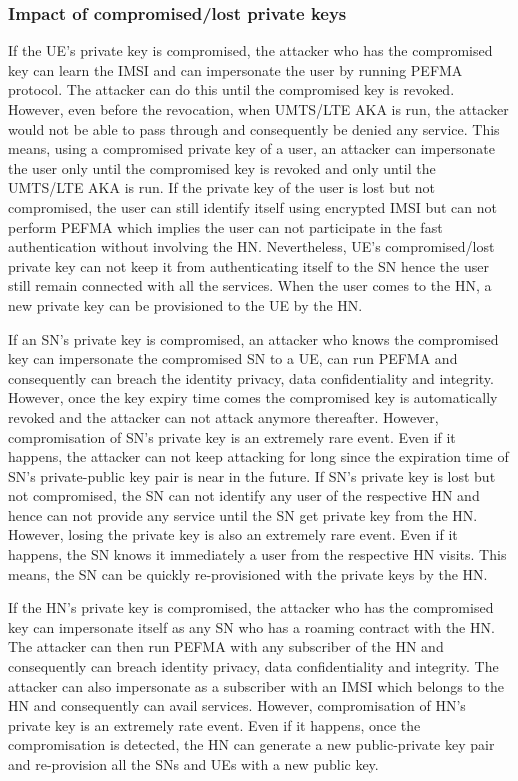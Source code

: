\documentclass{river-journal}
\begin{document}
\subsubsection{Impact of compromised/lost private keys}
If the UE's private key is compromised, the attacker who has the compromised key can learn the IMSI and can impersonate the user by running PEFMA protocol. The attacker can do this until the compromised key is revoked. However, even before the revocation, when UMTS/LTE AKA is run, the attacker would not be able to pass through and consequently be denied any service. This means, using a compromised private key of a user, an attacker can impersonate the user only until the compromised key is revoked and only until the UMTS/LTE AKA is run. If the private key of the user is lost but not compromised, the user can still identify itself using encrypted IMSI but can not perform PEFMA which implies the user can not participate in the fast authentication without involving the HN. Nevertheless, UE's compromised/lost private key can not keep it from authenticating itself to the SN hence the user still remain connected with all the services. When the user comes to the HN, a new private key can be provisioned to the UE by the HN.

If an SN's private key is compromised, an attacker who knows the compromised key can impersonate the compromised SN to a UE, can run PEFMA and consequently can breach the identity privacy, data confidentiality and integrity. However, once the key expiry time comes the compromised key is automatically revoked and the attacker can not attack anymore thereafter. However, compromisation of SN's private key is an extremely rare event. Even if it happens, the attacker can not keep attacking for long since the expiration time of SN's private-public key pair is near in the future. If SN's private key is lost but not compromised, the SN can not identify any user of the respective HN and hence can not provide any service until the SN get private key from the HN. However, losing the private key is also an extremely rare event. Even if it happens, the SN knows it immediately a user from the respective HN visits. This means, the SN can be quickly re-provisioned with the private keys by the HN.

If the HN's private key is compromised, the attacker who has the compromised key can impersonate itself as any SN who has a roaming contract with the HN. The attacker can then run PEFMA with any subscriber of the HN and consequently can breach identity privacy, data confidentiality and integrity. The attacker can also impersonate as a subscriber with an IMSI which belongs to the HN and consequently can avail services. However, compromisation of HN's private key is an extremely rate event. Even if it happens, once the compromisation is detected, the HN can generate a new public-private key pair and re-provision all the SNs and UEs with a new public key. 
\end{document}
